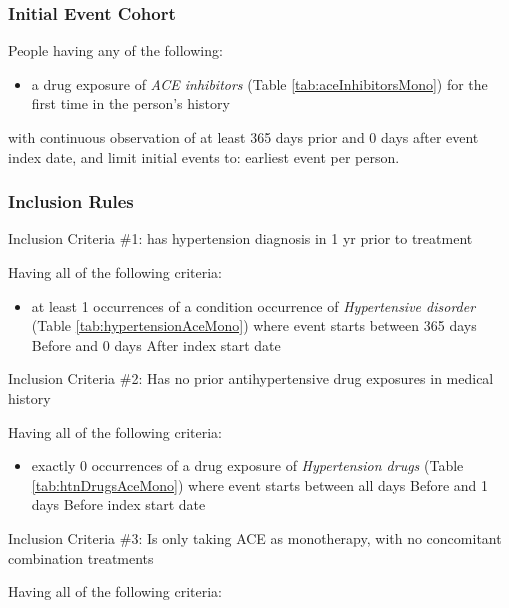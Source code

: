\documentclass[11pt]{book}
\providecommand{\tightlist}{%
  \setlength{\itemsep}{0pt}\setlength{\parskip}{0pt}}
\theoremstyle{definition}
\theoremstyle{definition}
\theoremstyle{definition}
\theoremstyle{remark}
\begin{document}
\subsubsection*{Initial Event Cohort}\label{initial-event-cohort-1}

People having any of the following:

\begin{itemize}
\tightlist
\item
  a drug exposure of \emph{ACE inhibitors} (Table
  \ref{tab:aceInhibitorsMono}) for the first time in the person's
  history
\end{itemize}

with continuous observation of at least 365 days prior and 0 days after
event index date, and limit initial events to: earliest event per
person.

\subsubsection*{Inclusion Rules}\label{inclusion-rules}

Inclusion Criteria \#1: has hypertension diagnosis in 1 yr prior to
treatment

Having all of the following criteria:

\begin{itemize}
\tightlist
\item
  at least 1 occurrences of a condition occurrence of \emph{Hypertensive
  disorder} (Table \ref{tab:hypertensionAceMono}) where event starts
  between 365 days Before and 0 days After index start date
\end{itemize}

Inclusion Criteria \#2: Has no prior antihypertensive drug exposures in
medical history

Having all of the following criteria:

\begin{itemize}
\tightlist
\item
  exactly 0 occurrences of a drug exposure of \emph{Hypertension drugs}
  (Table \ref{tab:htnDrugsAceMono}) where event starts between all days
  Before and 1 days Before index start date
\end{itemize}

Inclusion Criteria \#3: Is only taking ACE as monotherapy, with no
concomitant combination treatments

Having all of the following criteria:
\end{document}
